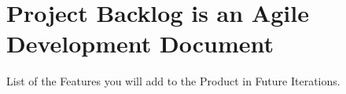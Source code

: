 \section{Project Backlog is an Agile Development Document}

List of the Features you will add to the Product in Future Iterations.